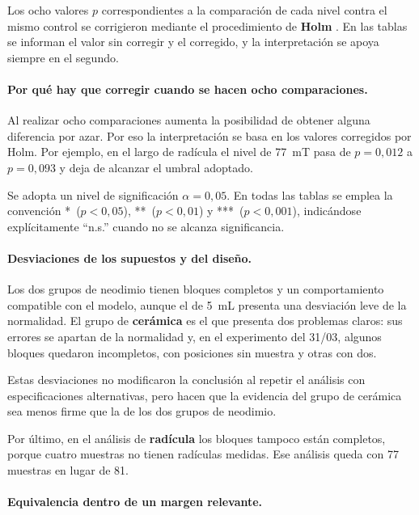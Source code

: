Los ocho valores \(p\) correspondientes a la comparación de cada nivel contra el mismo control se corrigieron mediante el procedimiento de \textbf{Holm} \cite{holm_1979}. En las tablas se informan el valor sin corregir y el corregido, y la interpretación se apoya siempre en el segundo.

\paragraph{Por qué hay que corregir cuando se hacen ocho comparaciones.}

Al realizar ocho comparaciones aumenta la posibilidad de obtener alguna diferencia por azar. Por eso la interpretación se basa en los valores corregidos por Holm. Por ejemplo, en el largo de radícula el nivel de 77~mT pasa de \(p = 0{,}012\) a \(p = 0{,}093\) y deja de alcanzar el umbral adoptado.

Se adopta un nivel de significación \(\alpha = 0{,}05\). En todas las tablas se emplea la convención *~(\(p < 0{,}05\)), **~(\(p < 0{,}01\)) y ***~(\(p < 0{,}001\)), indicándose explícitamente ``n.s.'' cuando no se alcanza significancia.

\paragraph{Desviaciones de los supuestos y del diseño.}

Los dos grupos de neodimio tienen bloques completos y un comportamiento compatible con el modelo, aunque el de 5~mL presenta una desviación leve de la normalidad. El grupo de \textbf{cerámica} es el que presenta dos problemas claros: sus errores se apartan de la normalidad y, en el experimento del 31/03, algunos bloques quedaron incompletos, con posiciones sin muestra y otras con dos.

Estas desviaciones no modificaron la conclusión al repetir el análisis con especificaciones alternativas, pero hacen que la evidencia del grupo de cerámica sea menos firme que la de los dos grupos de neodimio.

Por último, en el análisis de \textbf{radícula} los bloques tampoco están completos, porque cuatro muestras no tienen radículas medidas. Ese análisis queda con 77 muestras en lugar de 81.

\paragraph{Equivalencia dentro de un margen relevante.}\leavevmode\par

